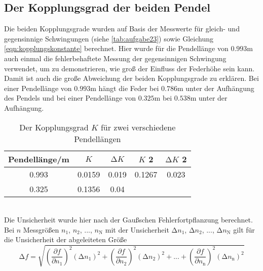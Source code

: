   \subsection{Der Kopplungsgrad der beiden Pendel}
  \label{sec:kopplungsgrad}
  Die beiden Kopplungsgrade wurden auf Basis der Messwerte für gleich- und gegensinnige Schwingungen (siehe \ref{tab:aufgabe23}) sowie Gleichung \eqref{eqn:kopplungskonstante}
  berechnet. Hier wurde für die Pendellänge von $0.993$m auch einmal die fehlerbehaftete Messung der
  gegensinnigen Schwingung verwendet, um zu demonstrieren, wie groß der Einfluss der Federhöhe sein kann. Damit ist auch die
  große Abweichung der beiden Kopplungsgrade zu erklären. Bei einer Pendellänge von $0.993$m hängt die Feder bei $0.786$m unter
  der Aufhängung des Pendels und bei einer Pendellänge von $0.325$m bei $0.538$m unter der Aufhängung.
    \begin{table}
      \centering
        \caption{Der Kopplungsgrad $K$ für zwei verschiedene Pendellängen}
          \label{tab:aufgabe5}
          \begin{tabular}{S S S S S}
            \toprule
            {Pendellänge/m} & {$K$}  & {$\increment K$} & {$K$ 2} & {$\increment K$ 2}\\
               &   0.0159 & 0.019 &  0.1267 & 0.023\\
            0.325   &   0.1356 & 0.04  &         &      \\
            \bottomrule
          \end{tabular}
        \end{table}
        \\
        Die Unsicherheit wurde hier nach der Gaußschen Fehlerfortpflanzung berechnet.
        Bei $n$ Messgrößen $n_\text{1}$, $n_\text{2}$, ..., $n_\text{N}$ mit der Unsicherheit
        $\increment n_\text{1}$, $\increment n_\text{2}$, ..., $\increment n_\text{N}$ gilt für die Unsicherheit
        der abgeleiteten Größe
        \begin{equation}
          \label{eqn:fehlerfortpflanzung}
          \increment f = \sqrt{\left(\frac{\partial f}{\partial n_\text{1}} \right)^2 (\increment n_\text{1})^2 + \left(\frac{\partial f}{\partial n_\text{2}} \right)^2 (\increment
          n_\text{2})^2 + ... + \left(\frac{\partial
          f}{\partial  n_\text{n}} \right)^2 (\increment  n_\text{n})^2}
        \end{equation}
